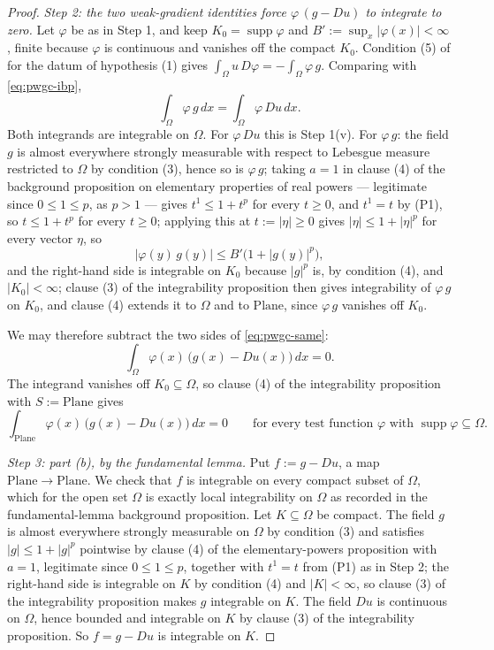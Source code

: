 \begin{proof}
\medskip\noindent\emph{Step 2: the two weak-gradient identities force $\varphi\,(g-Du)$ to
integrate to zero.}
Let $\varphi$ be as in Step 1, and keep $K_0=\operatorname{supp}\varphi$ and
$B':=\sup_x\lvert\varphi(x)\rvert<\infty$, finite because $\varphi$ is continuous and vanishes
off the compact $K_0$.  Condition (5) of  for the datum of hypothesis (1)
gives $\int_\Omega u\,D\varphi=-\int_\Omega\varphi\,g$.  Comparing with \eqref{eq:pwgc-ibp},
\begin{equation}\label{eq:pwgc-same}
  \int_\Omega\varphi\,g\,dx=\int_\Omega\varphi\,Du\,dx .
\end{equation}
Both integrands are integrable on $\Omega$.  For $\varphi\,Du$ this is Step 1(v).  For
$\varphi\,g$: the field $g$ is almost everywhere strongly measurable with respect to Lebesgue
measure restricted to $\Omega$ by condition (3), hence so is $\varphi\,g$; taking $a=1$ in
clause (4) of the background proposition on elementary properties of real powers --- legitimate
since $0\le1\le p$, as $p>1$ --- gives $t^{1}\le1+t^{p}$ for every $t\ge0$, and $t^{1}=t$ by
(P1), so $t\le1+t^{p}$ for every $t\ge0$; applying this at $t:=\lvert\eta\rvert\ge0$ gives
$\lvert\eta\rvert\le1+\lvert\eta\rvert^{p}$ for every vector $\eta$, so
\[
  \lvert\varphi(y)\,g(y)\rvert\le B'\bigl(1+\lvert g(y)\rvert^{p}\bigr),
\]
and the right-hand side is integrable on $K_0$ because $\lvert g\rvert^{p}$ is, by condition
(4), and $\lvert K_0\rvert<\infty$; clause (3) of the integrability proposition then gives
integrability of $\varphi\,g$ on $K_0$, and clause (4) extends it to $\Omega$ and to
$\mathrm{Plane}$, since $\varphi\,g$ vanishes off $K_0$.

We may therefore subtract the two sides of \eqref{eq:pwgc-same}:
\[
  \int_\Omega\varphi(x)\,\bigl(g(x)-Du(x)\bigr)\,dx=0 .
\]
The integrand vanishes off $K_0\subseteq\Omega$, so clause (4) of the integrability proposition
with $S:=\mathrm{Plane}$ gives
\begin{equation}\label{eq:pwgc-test}
  \int_{\mathrm{Plane}}\varphi(x)\,\bigl(g(x)-Du(x)\bigr)\,dx=0
  \qquad\text{for every test function }\varphi\text{ with }\operatorname{supp}\varphi\subseteq\Omega .
\end{equation}

\medskip\noindent\emph{Step 3: part (b), by the fundamental lemma.}
Put $f:=g-Du$, a map $\mathrm{Plane}\to\mathrm{Plane}$.  We check that $f$ is integrable on
every compact subset of $\Omega$, which for the open set $\Omega$ is exactly local
integrability on $\Omega$ as recorded in the fundamental-lemma background proposition.  Let
$K\subseteq\Omega$ be compact.  The field $g$ is almost everywhere strongly measurable on
$\Omega$ by condition (3) and satisfies $\lvert g\rvert\le1+\lvert g\rvert^{p}$ pointwise by
clause (4) of the elementary-powers proposition with $a=1$, legitimate since $0\le1\le p$,
together with $t^{1}=t$ from (P1) as in Step 2; the right-hand side is
integrable on $K$ by condition (4) and $\lvert K\rvert<\infty$, so clause (3) of the
integrability proposition makes $g$ integrable on $K$.  The field $Du$ is continuous on
$\Omega$, hence bounded and integrable on $K$ by clause (3) of the integrability proposition.
So $f=g-Du$ is integrable on $K$.


\end{proof}
